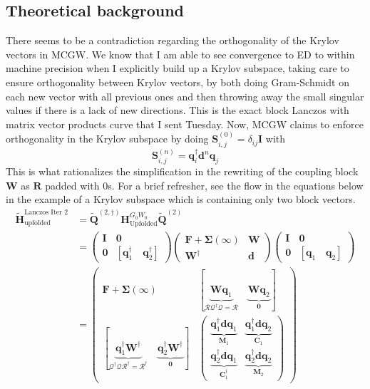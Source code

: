 \subsection{Theoretical background}
There seems to be a contradiction regarding the orthogonality of the Krylov vectors in MCGW. We know that I am able to see convergence to ED to within machine precision when I explicitly build up a Krylov subspace, taking care to ensure orthogonality between Krylov vectors, by both doing Gram-Schmidt on each new vector with all previous ones and then throwing away the small singular values if there is a lack of new directions. This is the exact block Lanczos with matrix vector products curve that I sent Tuesday. Now, MCGW claims to enforce orthogonality in the Krylov subspace by doing $\bm{S}_{i,j}^{(0)} = \delta_{ij}\bm{I}$ with 
\begin{equation}
    \bm{S}_{i,j}^{(n)} = \bm{q}_i^{\dag}\bm{d}^n\bm{q}_j
\label{eqn:mcgw_dense}
\end{equation}
This is what rationalizes the simplification in the rewriting of the coupling block $\bm{W}$ as $\bm{R}$ padded with 0s. For a brief refresher, see the flow in the equations below in the example of a Krylov subspace which is containing only two block vectors.
\begin{align}
    \bm{\tilde{H}}_{\text{upfolded}}^{\text{Lanczos Iter 2}} &= \bm{\tilde{Q}}^{(2,\dagger)} \bm{H}_{\text{Upfolded}}^{G_0W_0} \bm{\tilde{Q}}^{(2)}\\
    &= \begin{pmatrix}
        \bm{I} & \bm{0} \\
        \bm{0} & [\bm{q}_1^{\dag}\quad \bm{q}_2^{\dag}]
    \end{pmatrix}
    \begin{pmatrix}
        \bm{F} + \bm{\Sigma}(\infty) & \bm{W}\\
        \bm{W}^{\dagger} & \bm{d}
    \end{pmatrix}
    \begin{pmatrix}
        \bm{I} & \bm{0} \\
        \bm{0} & [\bm{q}_1\quad \bm{q}_2]
    \end{pmatrix}\\
    &= \begin{pmatrix}
        \bm{F} + \bm{\Sigma}(\infty) & [\underbrace{\bm{W}\bm{q}_1}_{\bm{\mathcal{R}}\bm{\mathcal{Q}}^{\dag}\bm{\mathcal{Q}}=\bm{\mathcal{R}}} \quad \underbrace{\bm{W}\bm{q}_2}_{\bm{0}}]\\
        [\underbrace{\bm{q}_1^{\dag}\bm{W}^{\dagger}}_{\bm{\mathcal{Q}}^{\dagger}\bm{\mathcal{Q}}\bm{\mathcal{R}}^{\dagger}= \bm{\mathcal{R}}^{\dagger}}\quad \underbrace{\bm{q}_2^{\dag}\bm{W}^{\dagger}}_{\bm{0}}] & \begin{pmatrix}
            \underbrace{\bm{q}_1^{\dag}\bm{d}\bm{q}_1}_{\bm{M}_1} & \underbrace{\bm{q}_1^{\dag}\bm{d}\bm{q}_2}_{\bm{C}_1}\\
            \underbrace{\bm{q}_2^{\dag}\bm{d}\bm{q}_1}_{\bm{C}_1^{\dagger}} & \underbrace{\bm{q}_2^{\dag}\bm{d}\bm{q}_2}_{\bm{M}_2}
        \end{pmatrix}
    \end{pmatrix}
    \label{eqn:lanczos_projection}
\end{align}
